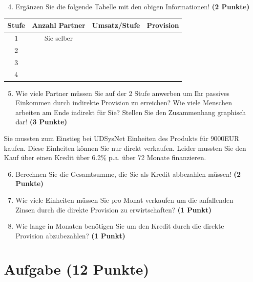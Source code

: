\documentclass[a4paper, 9pt]{scrartcl}\usepackage[]{graphicx}\usepackage[]{xcolor}
\begin{document}
\begin{enumerate}
  \setcounter{enumi}{3}
\item Erg{\"a}nzen Sie die folgende Tabelle mit den obigen Informationen! \textbf{(2 Punkte)}
\end{enumerate}

\begin{center}
\begin{tabular}{c|c|c|c}
  \toprule
  \textbf{Stufe} & \textbf{Anzahl Partner}  & \textbf{Umsatz/Stufe} & \textbf{Provision}\\
  \midrule
  1 & Sie selber  &  & \\ \midrule
  2 &   &  &  \\ \midrule
  3 &   &  &  \\ \midrule
  4 &   &  &  \\
  \bottomrule
\end{tabular}
\end{center}

\begin{enumerate}
  \setcounter{enumi}{4}
\item Wie viele Partner m{\"u}ssen Sie auf der 2 Stufe anwerben um Ihr passives
  Einkommen durch indirekte Provision zu erreichen? Wie viele Menschen
  arbeiten am Ende indirekt f{\"u}r Sie? Stellen Sie den
  Zusammenhang graphisch dar!  \textbf{(3 Punkte)}
\end{enumerate}

Sie mussten zum Einstieg bei UDSysNet Einheiten des Produkts
f{\"u}r 9000EUR kaufen. Diese Einheiten k{\"o}nnen Sie nur direkt
verkaufen. Leider mussten Sie den Kauf {\"u}ber einen Kredit {\"u}ber
6.2\% p.a. {\"u}ber 72 Monate finanzieren.

\begin{enumerate}
  \setcounter{enumi}{5}
\item Berechnen Sie die Gesamtsumme, die Sie als Kredit abbezahlen m{\"u}ssen! \textbf{(2 Punkte)}
\item Wie viele Einheiten m{\"u}ssen Sie pro Monat verkaufen um die anfallenden Zinsen
  durch die direkte Provision zu erwirtschaften? \textbf{(1 Punkt)}
\item Wie lange in
  Monaten ben{\"o}tigen Sie um den Kredit durch die direkte
  Provision abzubezahlen? \textbf{(1 Punkt)}
\end{enumerate} 
\clearpage

\section{Aufgabe \hfill (12 Punkte)}
\end{document}
